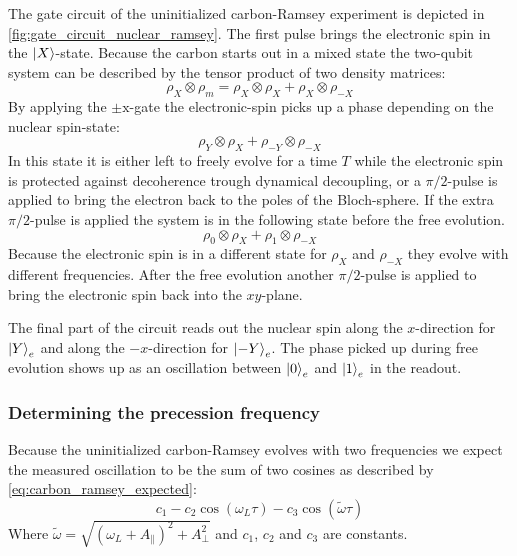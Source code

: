 The gate circuit of the uninitialized carbon-Ramsey experiment is depicted in \cref{fig:gate_circuit_nuclear_ramsey}.
The first pulse brings the electronic spin in the ${\left\vert{X}\right\rangle}$-state.
Because the carbon starts out in a mixed state the two-qubit system can be described by the tensor product of two density matrices:
\begin{equation}
    \rho_X \otimes \rho_m = \rho_X \otimes \rho_{X} +\rho_X \otimes \rho_{-X}
\end{equation}
By applying the $\pm{\mathrm{x}}$-gate  the electronic-spin picks up a phase depending on the nuclear spin-state:
\begin{equation}
     \rho_Y \otimes \rho_{X} +\rho_{-Y} \otimes \rho_{-X}
    \label{eq:density_after_Ren}
\end{equation}
In this state it is either left to freely evolve for a time $T$ while the electronic spin is protected against decoherence trough dynamical decoupling, or a $\pi/2$-pulse is applied to bring the electron back to the poles of the Bloch-sphere.
If the extra $\pi/2$-pulse is applied the system is in the following state before the free evolution.
\begin{equation}
     \rho_0 \otimes \rho_{X} +\rho_{1} \otimes \rho_{-X}
\end{equation}
Because the electronic spin is in a different state for $\rho_{X}$ and $\rho_{-X}$ they evolve with different frequencies.
After the free evolution another $\pi/2$-pulse is applied to bring the electronic spin back into the $xy$-plane.

The final part of the circuit reads out the nuclear spin along the $x$-direction for ${\left\vert{Y}\right\rangle}_e$ and along the $-x$-direction for ${\left\vert{-Y}\right\rangle}_e$.
The phase picked up during free evolution shows up as an oscillation between ${\left\vert{0}\right\rangle}_e$ and ${\left\vert{1}\right\rangle}_e$ in the readout.

\subsubsection{Determining the precession frequency}
Because the uninitialized carbon-Ramsey evolves with two frequencies we expect the measured oscillation to be the sum of two cosines as described by \cref{eq:carbon_ramsey_expected}:
\begin{equation}
    c_1 - c_2 \cos(\omega_L \tau ) -c_3  \cos (\tilde{\omega} \tau )
    \label{eq:carbon_ramsey_expected}
\end{equation}
Where $ \tilde\omega =   \sqrt{(\omega_L+A_\parallel) ^2 + A_\perp^2} $ and $c_1$, $c_2$ and $c_3$ are constants.


